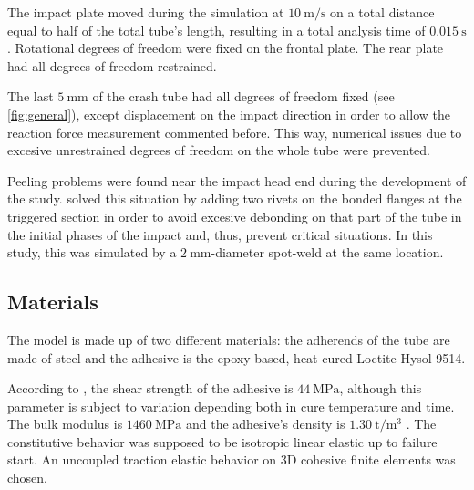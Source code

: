 \documentclass[cmfonts]{witpress}
\begin{document}
The impact plate moved during the simulation at $\SI{10}{\m/\s}$ on a total distance equal to half of the total tube's length, resulting in a total analysis time of $\SI{0.015}{\s}$. Rotational degrees of freedom were fixed on the frontal plate. The rear plate had all degrees of freedom restrained.

The last $\SI{5}{\mm}$ of the crash tube had all degrees of freedom fixed (see \cref{fig:general}), except displacement on the impact direction in order to allow the reaction force measurement commented before. This way, numerical issues due to excesive unrestrained degrees of freedom on the whole tube were prevented.

Peeling problems were found near the impact head end during the development of the study. \cite{Peroni2009} solved this situation by adding two rivets on the bonded flanges at the triggered section in order to avoid excesive debonding on that part of the tube in the initial phases of the impact and, thus, prevent critical situations. In this study, this was simulated by a $\SI{2}{\mm}$-diameter spot-weld at the same location.

\subsection{Materials}

The model is made up of two different materials: the adherends of the tube are made of steel and the adhesive is the epoxy-based, heat-cured Loctite Hysol 9514.

According to \cite{manufCatalog}, the shear strength of the adhesive is $\SI{44}{\MPa}$, although this parameter is subject to variation depending both in cure temperature and time. The bulk modulus is $\SI{1460}{\MPa}$ and the adhesive's density is $\SI{1.30}{\tonne/\m^3}$ \cite{manufCatalog}. The constitutive behavior was supposed to be isotropic linear elastic \cite{SernaMoreno2015} up to failure start. An uncoupled traction elastic behavior \cite{Sadowski2010, Sadowski2011, Scattina2011, Sadowski2014} on 3D cohesive finite elements was chosen.
\end{document}

